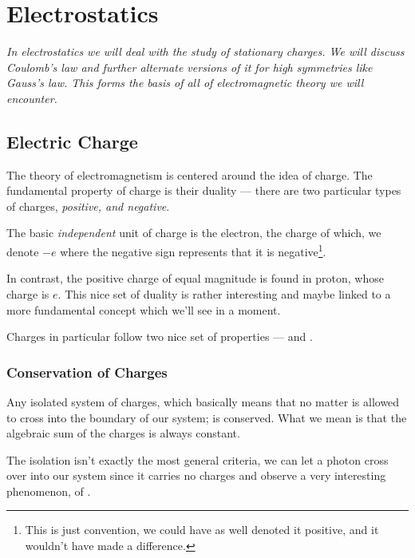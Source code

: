 \chapter{Electrostatics}


\emph{In electrostatics we will deal with the study of stationary charges. We will 
discuss Coulomb's law and further alternate versions of it 
for high symmetries like Gauss's law. This forms the basis of all 
of electromagnetic theory we will encounter.}

\section{Electric Charge}

The theory of electromagnetism is centered around the idea of charge. The 
fundamental property of charge is their duality --- there are two 
particular types of charges, \emph{positive, and negative}. 

The basic \emph{independent} unit of charge is the electron, the charge of which, 
we denote \(-e\) where the negative sign represents that it is negative\footnote{This
is just convention, we could have as well denoted it positive, and it wouldn't 
have made a difference.}. 

In contrast, the positive charge of equal magnitude is found in proton, 
whose charge is \(e\). This nice set of duality is rather interesting and maybe 
linked to a more fundamental concept which we'll see in a moment. 

Charges in particular follow two nice set of properties ---  and 
.

\subsection{Conservation of Charges}

Any isolated system of charges, which basically means that no matter is allowed 
to cross into the boundary of our system; is conserved. What we mean is that the 
algebraic sum of the charges is always constant.

The isolation isn't exactly the most general criteria, we can let a photon 
cross over into our system since it carries no charges and observe a very interesting 
phenomenon, of . 

